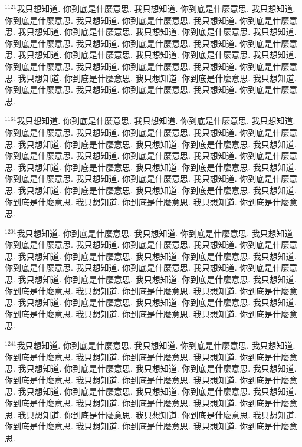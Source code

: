 \documentclass{book}
\begin{document}
$^{1121}$我只想知道.
你到底是什麼意思.
我只想知道.
你到底是什麼意思.
我只想知道.
你到底是什麼意思.
我只想知道.
你到底是什麼意思.
我只想知道.
你到底是什麼意思.
我只想知道.
你到底是什麼意思.
我只想知道.
你到底是什麼意思.
我只想知道.
你到底是什麼意思.
我只想知道.
你到底是什麼意思.
我只想知道.
你到底是什麼意思.
我只想知道.
你到底是什麼意思.
我只想知道.
你到底是什麼意思.
我只想知道.
你到底是什麼意思.
我只想知道.
你到底是什麼意思.
我只想知道.
你到底是什麼意思.
我只想知道.
你到底是什麼意思.
我只想知道.
你到底是什麼意思.
我只想知道.
你到底是什麼意思.
我只想知道.
你到底是什麼意思.
我只想知道.
你到底是什麼意思.

$^{1161}$我只想知道.
你到底是什麼意思.
我只想知道.
你到底是什麼意思.
我只想知道.
你到底是什麼意思.
我只想知道.
你到底是什麼意思.
我只想知道.
你到底是什麼意思.
我只想知道.
你到底是什麼意思.
我只想知道.
你到底是什麼意思.
我只想知道.
你到底是什麼意思.
我只想知道.
你到底是什麼意思.
我只想知道.
你到底是什麼意思.
我只想知道.
你到底是什麼意思.
我只想知道.
你到底是什麼意思.
我只想知道.
你到底是什麼意思.
我只想知道.
你到底是什麼意思.
我只想知道.
你到底是什麼意思.
我只想知道.
你到底是什麼意思.
我只想知道.
你到底是什麼意思.
我只想知道.
你到底是什麼意思.
我只想知道.
你到底是什麼意思.
我只想知道.
你到底是什麼意思.

$^{1201}$我只想知道.
你到底是什麼意思.
我只想知道.
你到底是什麼意思.
我只想知道.
你到底是什麼意思.
我只想知道.
你到底是什麼意思.
我只想知道.
你到底是什麼意思.
我只想知道.
你到底是什麼意思.
我只想知道.
你到底是什麼意思.
我只想知道.
你到底是什麼意思.
我只想知道.
你到底是什麼意思.
我只想知道.
你到底是什麼意思.
我只想知道.
你到底是什麼意思.
我只想知道.
你到底是什麼意思.
我只想知道.
你到底是什麼意思.
我只想知道.
你到底是什麼意思.
我只想知道.
你到底是什麼意思.
我只想知道.
你到底是什麼意思.
我只想知道.
你到底是什麼意思.
我只想知道.
你到底是什麼意思.
我只想知道.
你到底是什麼意思.
我只想知道.
你到底是什麼意思.

$^{1241}$我只想知道.
你到底是什麼意思.
我只想知道.
你到底是什麼意思.
我只想知道.
你到底是什麼意思.
我只想知道.
你到底是什麼意思.
我只想知道.
你到底是什麼意思.
我只想知道.
你到底是什麼意思.
我只想知道.
你到底是什麼意思.
我只想知道.
你到底是什麼意思.
我只想知道.
你到底是什麼意思.
我只想知道.
你到底是什麼意思.
我只想知道.
你到底是什麼意思.
我只想知道.
你到底是什麼意思.
我只想知道.
你到底是什麼意思.
我只想知道.
你到底是什麼意思.
我只想知道.
你到底是什麼意思.
我只想知道.
你到底是什麼意思.
我只想知道.
你到底是什麼意思.
我只想知道.
你到底是什麼意思.
我只想知道.
你到底是什麼意思.
我只想知道.
你到底是什麼意思.
\end{document}
